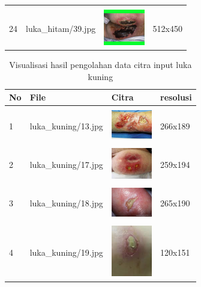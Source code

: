 \begin{table}[H]
\begin{tabular}{|m{0.2in}|m{1.2in}|m{0.7in}|m{0.7in}|}
		& &  &  \\
		24 & 
		luka\_hitam/39.jpg &
		\includegraphics[width=0.7in]{gambar/dataset_citra/luka_hitam/bahan/39.jpg}&
		512x450\\
		\hline

	\end{tabular}
\end{table}


\begin{table}[H]
	\centering
	\caption{Visualisasi hasil pengolahan data citra input luka kuning}
	\label{tabel_input_5}
	\begin{tabular}{|m{0.2in}|m{1.2in}|m{0.7in}|m{0.7in}|}
		\hline
		\textbf{No} & \textbf{File} & \textbf{Citra} & \textbf{resolusi} \\
		\hline
		
		& &  &  \\
		1 & 
		luka\_kuning/13.jpg &
		\includegraphics[width=0.7in]{gambar/dataset_citra/luka_kuning/bahan/13.jpg}&
		266x189\\
		\hline
		
		& &  &  \\
		2& 
		luka\_kuning/17.jpg &
		\includegraphics[width=0.7in]{gambar/dataset_citra/luka_kuning/bahan/17.jpg}&
		259x194\\
		\hline
		
		& &  &  \\
		3& 
		luka\_kuning/18.jpg &
		\includegraphics[width=0.7in]{gambar/dataset_citra/luka_kuning/bahan/18.jpg}&
		265x190\\
		\hline
		
		& &  &  \\
		4& 
		luka\_kuning/19.jpg &
		\includegraphics[width=0.7in]{gambar/dataset_citra/luka_kuning/bahan/19.jpg}&
		120x151\\
		\hline
		

\end{tabular}
\end{table}
